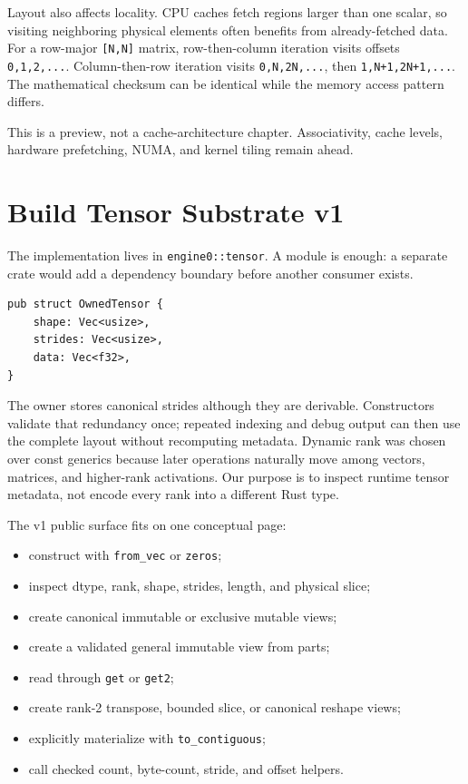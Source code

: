Layout also affects locality. CPU caches fetch regions larger than one
scalar, so visiting neighboring physical elements often benefits from
already-fetched data. For a row-major \texttt{{[}N,N{]}} matrix,
row-then-column iteration visits offsets \texttt{0,1,2,...}.
Column-then-row iteration visits \texttt{0,N,2N,...}, then
\texttt{1,N+1,2N+1,...}. The mathematical checksum can be identical
while the memory access pattern differs.

This is a preview, not a cache-architecture chapter. Associativity,
cache levels, hardware prefetching, NUMA, and kernel tiling remain
ahead.

\section{Build Tensor Substrate v1}\label{build-tensor-substrate-v1}

The implementation lives in \texttt{engine0::tensor}. A module is
enough: a separate crate would add a dependency boundary before another
consumer exists.

\begin{verbatim}
pub struct OwnedTensor {
    shape: Vec<usize>,
    strides: Vec<usize>,
    data: Vec<f32>,
}
\end{verbatim}

The owner stores canonical strides although they are derivable.
Constructors validate that redundancy once; repeated indexing and debug
output can then use the complete layout without recomputing metadata.
Dynamic rank was chosen over const generics because later operations
naturally move among vectors, matrices, and higher-rank activations. Our
purpose is to inspect runtime tensor metadata, not encode every rank
into a different Rust type.

The v1 public surface fits on one conceptual page:

\begin{itemize}
\tightlist
\item
  construct with \texttt{from\_vec} or \texttt{zeros};
\item
  inspect dtype, rank, shape, strides, length, and physical slice;
\item
  create canonical immutable or exclusive mutable views;
\item
  create a validated general immutable view from parts;
\item
  read through \texttt{get} or \texttt{get2};
\item
  create rank-2 transpose, bounded slice, or canonical reshape views;
\item
  explicitly materialize with \texttt{to\_contiguous};
\item
  call checked count, byte-count, stride, and offset helpers.
\end{itemize}

